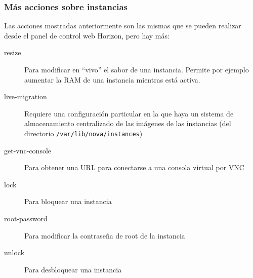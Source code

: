 \documentclass{beamer}
\begin{document}
\begin{frame}
  \frametitle{Más acciones sobre instancias}
  Las acciones mostradas anteriormente son las mismas que se pueden realizar
  desde el panel de control web Horizon, pero hay más:
  \begin{description}
  \item[resize] Para modificar en ``vivo'' el sabor de una instancia. Permite
    por ejemplo aumentar la RAM de una instancia mientras está activa.
  \item[live-migration] Requiere una configuración particular en la que haya un
    sistema de almacenamiento centralizado de las imágenes de las instancias
    (del directorio \texttt{/var/lib/nova/instances})
  \item[get-vnc-console] Para obtener una URL para conectarse a una consola
    virtual por VNC
  \item[lock] Para bloquear una instancia
  \item[root-password] Para modificar la contraseña de root de la instancia
  \item[unlock] Para desbloquear una instancia
  \end{description}
\end{frame}
\end{document}
